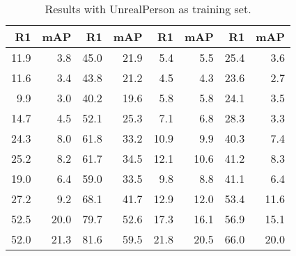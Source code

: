 \documentclass[10pt,twocolumn,letterpaper]{article}
\begin{document}
\begin{table*}[t]
\begin{minipage}[t]{\columnwidth}
\begin{tabular}{|r@{~~}r@{~~}|r@{~~~}r@{~~}|r@{~~}r@{~~}|r@{~~}r@{~~}|}
 R1 & mAP & R1 & mAP & R1 & mAP & R1 & mAP \\  \hline
 11.9 &  3.8	 & 45.0 & 21.9 &  5.4 &  5.5 & 25.4 & 3.6    \\ \hline         
 11.6 &  3.4	 & 43.8 & 21.2 &  4.5 &  4.3 & 23.6 & 2.7    \\ \hline         
 9.9 &  3.0	 & 40.2 & 19.6 &  5.8 &  5.8 & 24.1 & 3.5    \\ \hline         
 14.7 &  4.5	 & 52.1 & 25.3 &  7.1 &  6.8 & 28.3 & 3.3    \\ \hline         
 24.3 &  8.0	 & 61.8 & 33.2 & 10.9 &  9.9 & 40.3 & 7.4    \\ \hline         
 25.2 &  8.2	 & 61.7 & 34.5 & 12.1 & 10.6 & 41.2 & 8.3    \\ \hline         
 19.0 &  6.4	 & 59.0 & 33.5 &  9.8 &  8.8 & 41.1 & 6.4    \\ \hline         
 27.2 &  9.2	 & 68.1 & 41.7 & 12.9 & 12.0 & 53.4 & 11.6   \\ \hline         
 52.5 & 20.0	 & 79.7 & 52.6 & 17.3 & 16.1 & 56.9 & 15.1   \\ \hline         
 52.0 & 21.3	 & 81.6 & 59.5 & 21.8 & 20.5 & 66.0 & 20.0   \\ 
\hline
\end{tabular}
\caption{Results with UnrealPerson as training set.}
\label{tlb:cross-unreal}   
\end{minipage}
\end{table*}
\end{document}
